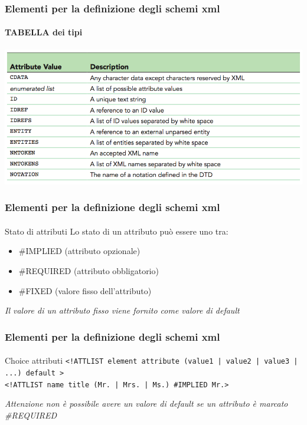 \begin{frame}
    \frametitle{Elementi per la definizione degli schemi xml}
    \framesubtitle{TABELLA dei tipi}
    \addtocounter{nframe}{1}

    \begin{center}
        \includegraphics[width=.8\textwidth]{imgs/xml-TipiAttributoXML.png}
    \end{center}
\end{frame}


\begin{frame}
    \frametitle{Elementi per la definizione degli schemi xml}
    \framesubtitle{}
    \addtocounter{nframe}{1}

    \begin{block}{Stato di attributi}
        Lo stato di un attributo può essere uno tra:
        \begin{itemize}
            \item \#IMPLIED (attributo opzionale)
            \item \#REQUIRED (attributo obbligatorio)
            \item \#FIXED (valore fisso dell'attributo)
        \end{itemize}
    \end{block}
    \textit{Il valore di un attributo fisso viene fornito come valore di default}
\end{frame}


\begin{frame}
    \frametitle{Elementi per la definizione degli schemi xml}
    \framesubtitle{}
    \addtocounter{nframe}{1}

    \begin{block}{Choice attributi}
     \texttt{<!ATTLIST element attribute (value1 | value2 | value3 | ...) default >}
    \\\texttt{<!ATTLIST name title (Mr. | Mrs. | Ms.) \#IMPLIED Mr.>}
    \end{block}
    \textit{Attenzione non è possibile avere un valore di default se un attributo è marcato \#REQUIRED}
\end{frame}

